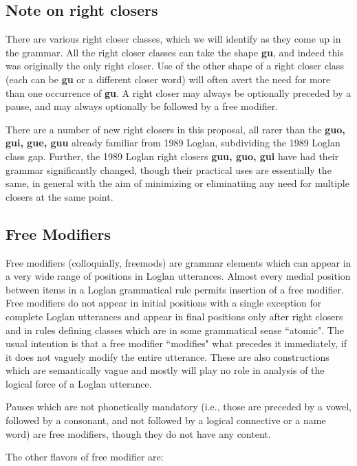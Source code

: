 \documentclass[12pt]{book}
\begin{document}
{\subsection{Note on right closers}

There are various right closer classes, which we will identify as they come up in the grammar.  All the right closer classes can take the shape
{\bf gu}, and indeed this was originally the only right closer.  Use of the other shape of a right closer class (each can be {\bf gu} or a different closer word)  will often avert the need for
more than one occurrence of {\bf gu}.  A right closer may always be optionally preceded by a pause, and may always optionally be followed by a free modifier.

There are a number of new right closers in this proposal, all rarer than the {\bf guo, gui, gue, guu} already familiar from 1989 Loglan, subdividing the 1989 Loglan class gap.
Further, the 1989 Loglan right closers {\bf guu, guo, gui} have had their grammar significantly changed, though their practical uses are essentially the same, in general with the aim
of minimizing or eliminatiing any need for multiple closers at the same point.

\subsection{Free Modifiers}

Free modifiers (colloquially, freemods) are grammar elements which can appear in a very wide range of positions in Loglan utterances.  Almost every medial position between items in a Loglan grammatical rule permits insertion of a free modifier.  Free modifiers do not appear in initial positions with a single exception for
complete Loglan utterances and appear in final positions only after right closers and in rules defining classes which are in some grammatical sense ``atomic".  The usual intention is that a free modifier ``modifies" what precedes it immediately, if it does not vaguely modify the entire utterance.  These are also constructions which are semantically vague and mostly will play no role in analysis of the logical force of a Loglan utterance.

Pauses which are not phonetically mandatory (i.e., those are preceded by a vowel, followed by a consonant, and not followed by a logical connective or a name word) are free modifiers, though they do not have any content.

The other flavors of free modifier are:

}
\end{document}
